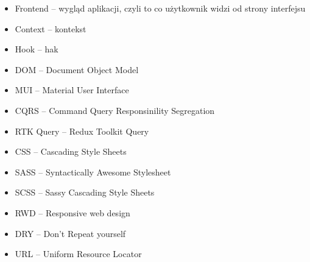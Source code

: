 \documentclass[a4paper,twoside,12pt]{book}
\begin{document}
\begin{appendices}
\begin{itemize}
    \item Frontend -- wygląd aplikacji, czyli to co użytkownik widzi od strony interfejsu
    \item Context -- kontekst
    \item Hook -- hak
    \item DOM -- Document Object Model
    \item MUI -- Material User Interface
    \item CQRS -- Command Query Responsinility Segregation
    \item RTK Query -- Redux Toolkit Query
    \item CSS -- Cascading Style Sheets
    \item SASS -- Syntactically Awesome Stylesheet
    \item SCSS -- Sassy Cascading Style Sheets
    \item RWD -- Responsive web design
    \item DRY -- Don't Repeat yourself
    \item URL -- Uniform Resource Locator


\end{itemize}




\end{appendices}
\end{document}
